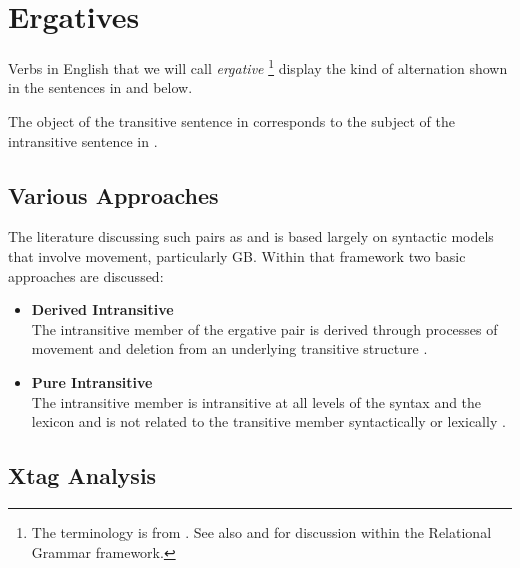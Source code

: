\chapter{Ergatives}
\label{ergatives}

Verbs in English that we will call {\it ergative} \footnote {The terminology is
from \cite{Burzio86}. See also \cite{Perlmutter78} and \cite{Rosen81} for
discussion within the Relational Grammar framework.} display the kind of
alternation shown in the sentences in  and  below.


The object of the transitive sentence in  corresponds to the subject
of the intransitive sentence in . 

\section{Various Approaches}

The literature discussing such pairs as  and  is based largely
on syntactic models that involve movement, particularly GB.  Within that
framework two basic approaches are discussed:

\begin{itemize}
\item {\bf Derived Intransitive}\\ The intransitive member of the
ergative pair is derived through processes of movement and deletion from an
underlying transitive structure \cite{Burzio86,HaleKeyser86,HaleKeyser87}.

\item {\bf Pure Intransitive}\\ The intransitive member is intransitive at all levels of the
syntax and the lexicon and is not related to the transitive member
syntactically or lexically \cite{Napoli88}.
\end{itemize}

\section{Xtag Analysis}

